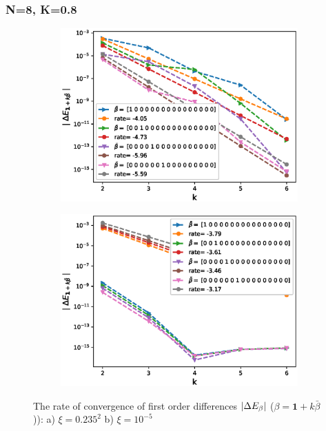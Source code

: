 \documentclass[11pt]{article}
\begin{document}
\newpage
\subsubsection*{N=8, K=0.8 }


\begin{figure}[h!]
\centering
\begin{subfigure}{.5\textwidth}
\centering
\includegraphics[width=1\linewidth]{./figures/effect_rho_differences/H_0_43_K_0_8/N_8/first_difference_rbergomi_8steps_H_043_K_0_8_rho__0_9_with_rate_W1.eps}
\caption{}
\label{fig:sub3}
\end{subfigure}%
\begin{subfigure}{.5\textwidth}
\centering
\includegraphics[width=1\linewidth]{./figures/effect_xi_differences/H_0_43_K_0_8/N_8/first_difference_rbergomi_8steps_H_043_K_0_8_xi_10__5_with_rate_W1.eps}
\caption{}
\label{fig:sub4}
\end{subfigure}

\caption{The rate of convergence of  first order differences $\left\lvert\Delta E_{\beta}\right\rvert$ ($\beta=\mathbf{1}+k \bar{\beta}$)): a) $\xi=0.235^2$ b)  $\xi=10^{-5}$}
\label{fig:test2}
\end{figure}
\end{document}
